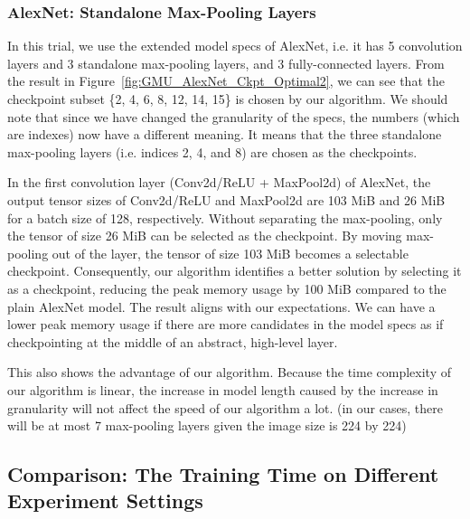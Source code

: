 

\subsubsection{AlexNet: Standalone Max-Pooling Layers}




In this trial, we use the extended model specs of AlexNet, i.e. it has 5 convolution layers and 3 standalone max-pooling layers, and 3 fully-connected layers. From the result in Figure~\ref{fig:GMU_AlexNet_Ckpt_Optimal2}, we can see that the checkpoint subset \{2, 4, 6, 8, 12, 14, 15\} is chosen by our algorithm.
We should note that since we have changed the granularity of the specs, the numbers (which are indexes) now have a different meaning. It means that the three standalone max-pooling layers (i.e. indices 2, 4, and 8) are chosen as the checkpoints.

In the first convolution layer (Conv2d/ReLU + MaxPool2d) of AlexNet, the output tensor sizes of Conv2d/ReLU and MaxPool2d are 103 MiB and 26 MiB for a batch size of 128, respectively.
Without separating the max-pooling, only the tensor of size 26 MiB can be selected as the checkpoint.
By moving max-pooling out of the layer, the tensor of size 103 MiB becomes a selectable checkpoint.
Consequently, our algorithm identifies a better solution by selecting it as a checkpoint, reducing the peak memory usage by 100 MiB compared to the plain AlexNet model.
The result aligns with our expectations.
We can have a lower peak memory usage if there are more candidates in the model specs as if checkpointing at the middle of an abstract, high-level layer. 

This also shows the advantage of our algorithm. Because the time complexity of our algorithm is linear, the increase in model length caused by the increase in granularity will not affect the speed of our algorithm a lot. (in our cases, there will be at most 7 max-pooling layers given the image size is 224 by 224)



\subsection{Comparison: The Training Time on Different Experiment Settings}

